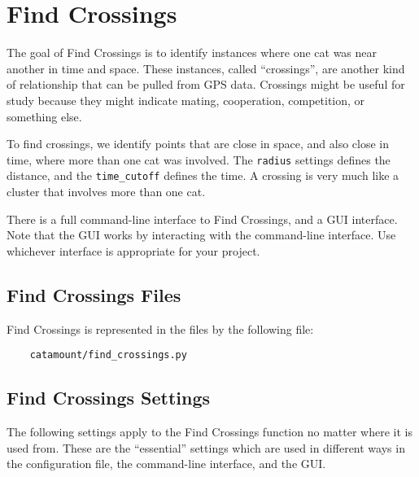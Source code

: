 \chapter{Find Crossings}
\hypertarget{find-crossings}{}

The goal of Find Crossings is to identify instances where one cat was
near another in time and space. These instances, called ``crossings'',
are another kind of relationship that can be pulled from GPS data.
Crossings might be useful for study because they might indicate
mating, cooperation, competition, or something else.

To find crossings, we identify points that are close in space, and
also close in time, where more than one cat was involved. The
\verb=radius= settings defines the distance, and the
\verb=time_cutoff= defines the time. A crossing is very much like a
cluster that involves more than one cat.

There is a full command-line interface to Find Crossings, and a GUI
interface. Note that the GUI works by interacting with the command-line
interface. Use whichever interface is appropriate for your project.

\section{Find Crossings Files}

Find Crossings is represented in the files by the following file:

\begin{verbatim}
    catamount/find_crossings.py
\end{verbatim}

\section{Find Crossings Settings}
\hypertarget{crossing-settings}{}

The following settings apply to the Find Crossings function no matter
where it is used from. These are the ``essential'' settings which are
used in different ways in the configuration file, the command-line
interface, and the GUI.


